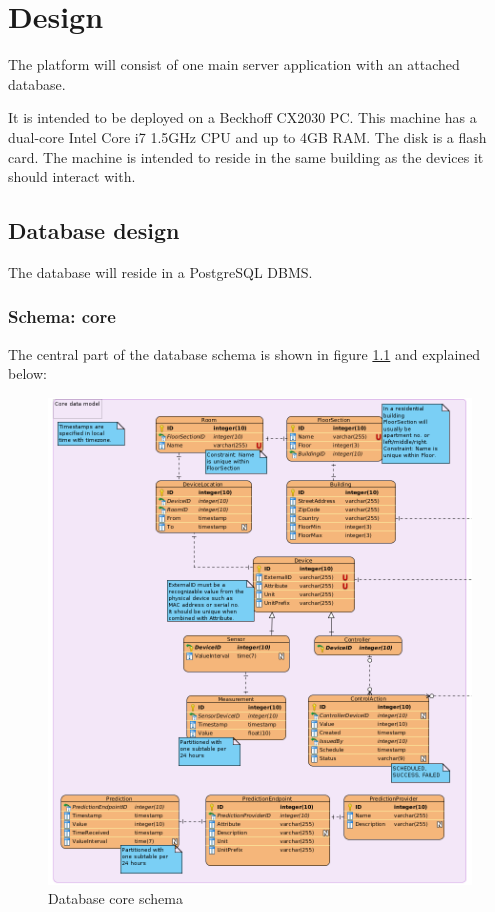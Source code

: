 \chapter{Design}
The platform will consist of one main server application with an attached database. 

It is intended to be deployed on a Beckhoff CX2030 PC. This machine has a dual-core Intel Core i7 1.5GHz CPU and up to 4GB RAM. The disk is a flash card. The machine is intended to reside in the same building as the devices it should interact with.

\section{Database design}
The database will reside in a PostgreSQL DBMS. 

\subsection{Schema: core}
The central part of the database schema is shown in figure \ref{figureDbCoreModel} and explained below:

\begin{figure}[H]
    \centering
    \includegraphics[width=\textwidth]{figures/db_core_schema}
    \caption{Database core schema}
    \label{figureDbCoreModel}
\end{figure}

